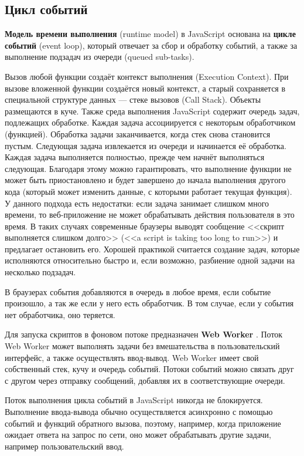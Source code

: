 \subsection{Цикл событий}

\textbf{Модель времени выполнения} (runtime model) в JavaScript основана на \textbf{цикле событий} (event loop), который отвечает за сбор и обработку событий, а также за выполнение подзадач из очереди (queued sub-tasks). \cite{js_event_loop}

Вызов любой функции создаёт контекст выполнения (Execution Context). При вызове вложенной функции создаётся новый контекст, а старый сохраняется в специальной структуре данных --- стеке вызовов (Call Stack). Объекты размещаются в куче. Также среда выполнения JavaScript содержит очередь задач, подлежащих обработке. Каждая задача ассоциируется с некоторым обработчиком (функцией). Обработка задачи заканчивается, когда стек снова становится пустым. Следующая задача извлекается из очереди и начинается её обработка. Каждая задача выполняется полностью, прежде чем начнёт выполняться следующая. Благодаря этому можно гарантировать, что выполнение функции не может быть приостановлено и будет завершено до начала выполнения другого кода (который может изменить данные, с которыми работает текущая функция). У данного подхода есть недостатки: если задача занимает слишком много времени, то веб-приложение не может обрабатывать действия пользователя в это время. В таких случаях современные браузеры выводят сообщение <<скрипт выполняется слишком долго>> (<<a script is taking too long to run>>) и предлагает остановить его. Хорошей практикой считается создание задач, которые исполняются относительно быстро и, если возможно, разбиение одной задачи на несколько подзадач. \cite{js_event_loop}

В браузерах события добавляются в очередь в любое время, если событие произошло, а так же если у него есть обработчик. В том случае, если у события нет обработчика, оно теряется. \cite{js_event_loop}

Для запуска скриптов в фоновом потоке предназначен \textbf{Web Worker} \cite{js_web_workers}. Поток Web Worker может выполнять задачи без вмешательства в пользовательский интерфейс, а также осуществлять ввод-вывод. Web Worker имеет свой собственный стек, кучу и очередь событий. Потоки событий можно связать друг с другом через отправку сообщений, добавляя их в соответствующие очереди.~\cite{js_event_loop}

Поток выполнения цикла событий в JavaScript никогда не блокируется. Выполнение ввода-вывода обычно осуществляется асинхронно с помощью событий и функций обратного вызова, поэтому, например, когда приложение ожидает ответа на запрос по сети, оно может обрабатывать другие задачи, например пользовательский ввод. \cite{js_event_loop}



